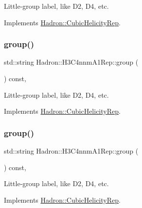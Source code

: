 Little-\/group label, like D2, D4, etc. 

Implements \mbox{\hyperlink{structHadron_1_1CubicHelicityRep_a101a7d76cd8ccdad0f272db44b766113}{Hadron\+::\+Cubic\+Helicity\+Rep}}.

\mbox{\label{structHadron_1_1H3C4nnmA1Rep_a90bcfd4f15d29f444a79b1dcd8198ea5}} 
\subsubsection{\texorpdfstring{group()}{group()}\hspace{0.1cm}{\footnotesize\ttfamily [2/3]}}
{\footnotesize\ttfamily std\+::string Hadron\+::\+H3\+C4nnm\+A1\+Rep\+::group (\begin{DoxyParamCaption}{ }\end{DoxyParamCaption}) const\hspace{0.3cm}{\ttfamily [inline]}, {\ttfamily [virtual]}}

Little-\/group label, like D2, D4, etc. 

Implements \mbox{\hyperlink{structHadron_1_1CubicHelicityRep_a101a7d76cd8ccdad0f272db44b766113}{Hadron\+::\+Cubic\+Helicity\+Rep}}.

\mbox{\label{structHadron_1_1H3C4nnmA1Rep_a90bcfd4f15d29f444a79b1dcd8198ea5}} 
\subsubsection{\texorpdfstring{group()}{group()}\hspace{0.1cm}{\footnotesize\ttfamily [3/3]}}
{\footnotesize\ttfamily std\+::string Hadron\+::\+H3\+C4nnm\+A1\+Rep\+::group (\begin{DoxyParamCaption}{ }\end{DoxyParamCaption}) const\hspace{0.3cm}{\ttfamily [inline]}, {\ttfamily [virtual]}}

Little-\/group label, like D2, D4, etc. 

Implements \mbox{\hyperlink{structHadron_1_1CubicHelicityRep_a101a7d76cd8ccdad0f272db44b766113}{Hadron\+::\+Cubic\+Helicity\+Rep}}.

